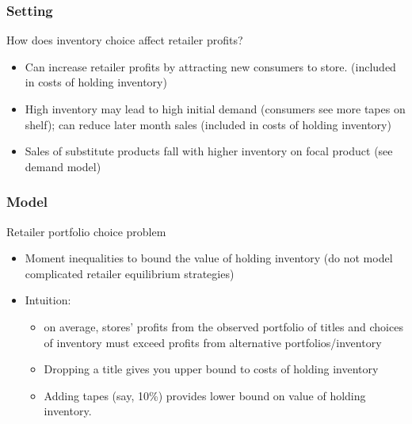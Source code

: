 \documentclass[notes=show]{beamer}
\begin{document}

\begin{frame}
\frametitle{Setting}

How does inventory choice affect retailer profits?

\begin{itemize}
\item Can increase retailer profits by attracting new consumers to store.
(included in costs of holding inventory)

\item High inventory may lead to high initial demand (consumers see more
tapes on shelf); can reduce later month sales (included in costs of holding
inventory)

\item Sales of substitute products fall with higher inventory on focal
product (see demand model)
\end{itemize}
\end{frame}


\begin{frame}
\frametitle{Model}

Retailer portfolio choice problem

\begin{itemize}
\item Moment inequalities to bound the value of holding inventory (do not
model complicated retailer equilibrium strategies)

\item Intuition:

\begin{itemize}
\item on average, stores' profits from the observed portfolio of
titles and choices of inventory must exceed profits from alternative
portfolios/inventory

\item Dropping a title gives you upper bound to costs of holding inventory

\item Adding tapes (say, 10\%) provides lower bound on value of holding
inventory.
\end{itemize}

\end{itemize}
\end{frame}
\end{document}
